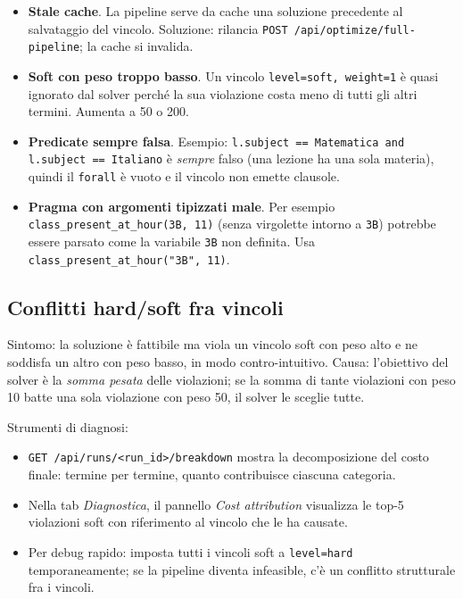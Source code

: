 \begin{itemize}
\item \textbf{Stale cache}. La pipeline serve da cache una
  soluzione precedente al salvataggio del vincolo. Soluzione:
  rilancia \texttt{POST /api/optimize/full-pipeline}; la cache
  si invalida.
\item \textbf{Soft con peso troppo basso}. Un vincolo
  \texttt{level=soft, weight=1} \`e quasi ignorato dal solver
  perch\'e la sua violazione costa meno di tutti gli altri
  termini. Aumenta a 50 o 200.
\item \textbf{Predicate sempre falsa}. Esempio:
  \texttt{l.subject == Matematica and l.subject == Italiano}
  \`e \emph{sempre} falso (una lezione ha una sola materia),
  quindi il \texttt{forall} \`e vuoto e il vincolo non emette
  clausole.
\item \textbf{Pragma con argomenti tipizzati male}. Per esempio
  \texttt{class\_present\_at\_hour(3B, 11)} (senza virgolette
  intorno a \texttt{3B}) potrebbe essere parsato come la
  variabile \texttt{3B} non definita. Usa
  \texttt{class\_present\_at\_hour("3B", 11)}.
\end{itemize}

\subsection{Conflitti hard/soft fra vincoli}

Sintomo: la soluzione \`e fattibile ma viola un vincolo soft
con peso alto e ne soddisfa un altro con peso basso, in modo
contro-intuitivo. Causa: l'obiettivo del solver \`e la
\emph{somma pesata} delle violazioni; se la somma di tante
violazioni con peso 10 batte una sola violazione con peso 50,
il solver le sceglie tutte.

Strumenti di diagnosi:

\begin{itemize}
\item \texttt{GET /api/runs/<run\_id>/breakdown} mostra la
  decomposizione del costo finale: termine per termine, quanto
  contribuisce ciascuna categoria.
\item Nella tab \emph{Diagnostica}, il pannello \emph{Cost
  attribution} visualizza le top-5 violazioni soft con
  riferimento al vincolo che le ha causate.
\item Per debug rapido: imposta tutti i vincoli soft a
  \texttt{level=hard} temporaneamente; se la pipeline diventa
  infeasible, c'\`e un conflitto strutturale fra i vincoli.
\end{itemize}

